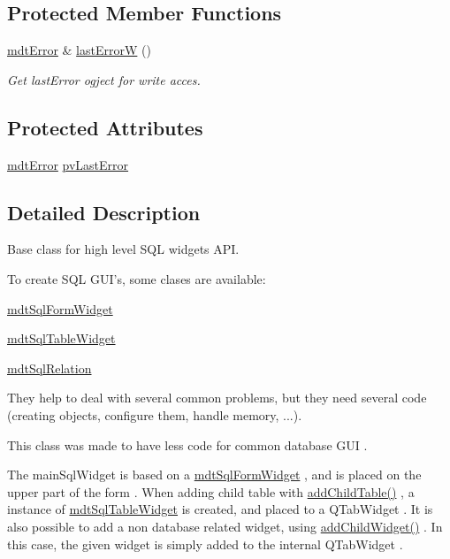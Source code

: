 \subsection*{Protected Member Functions}
\begin{DoxyCompactItemize}
\item 
\hyperlink{classmdt_error}{mdt\-Error} \& \hyperlink{classmdt_sql_form_abee43c43913605ad585ad163b998fca4}{last\-Error\-W} ()
\begin{DoxyCompactList}\small\item\em Get last\-Error ogject for write acces. \end{DoxyCompactList}\end{DoxyCompactItemize}
\subsection*{Protected Attributes}
\begin{DoxyCompactItemize}
\item 
\hyperlink{classmdt_error}{mdt\-Error} \hyperlink{classmdt_sql_form_afc24e8dedd1249a29708347fdff560fd}{pv\-Last\-Error}
\end{DoxyCompactItemize}


\subsection{Detailed Description}
Base class for high level S\-Q\-L widgets A\-P\-I. 

To create S\-Q\-L G\-U\-I's, some clases are available\-:
\begin{DoxyItemize}
\item \hyperlink{classmdt_sql_form_widget}{mdt\-Sql\-Form\-Widget}
\item \hyperlink{classmdt_sql_table_widget}{mdt\-Sql\-Table\-Widget}
\item \hyperlink{classmdt_sql_relation}{mdt\-Sql\-Relation}
\end{DoxyItemize}

They help to deal with several common problems, but they need several code (creating objects, configure them, handle memory, ...).

This class was made to have less code for common database G\-U\-I .

The main\-Sql\-Widget is based on a \hyperlink{classmdt_sql_form_widget}{mdt\-Sql\-Form\-Widget} , and is placed on the upper part of the form . When adding child table with \hyperlink{classmdt_sql_form_a3504a54f26777ed38efce5cc151a1dbf}{add\-Child\-Table()} , a instance of \hyperlink{classmdt_sql_table_widget}{mdt\-Sql\-Table\-Widget} is created, and placed to a Q\-Tab\-Widget . It is also possible to add a non database related widget, using \hyperlink{classmdt_sql_form_a86174e002c2dd5496ab74a7eb67c614c}{add\-Child\-Widget()} . In this case, the given widget is simply added to the internal Q\-Tab\-Widget . 

